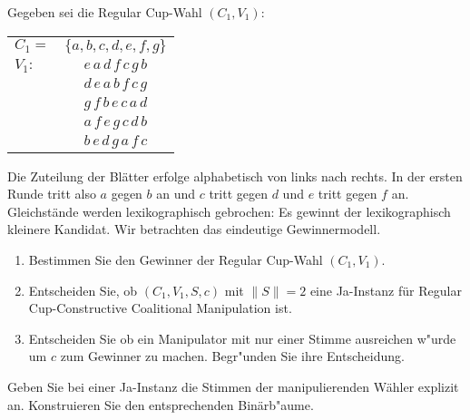 \documentclass[a4paper,12pt,titlepage,oneside]{article}
\newcommand\bc{\begin{center}}
\newcommand\ec{\end{center}}
\newcommand{\wahlind}[1]{(C_{#1},V_{#1})}
\newcommand{\ccmani}[1]{{\sc #1-Constructive Coalitional Manipulation}}
\begin{document}
\newline
Gegeben sei die Regular Cup-Wahl 
$\wahlind{1}$: 
\bc
\begin{tabular}{|lc|}
\hline
$C_1 =$&$ \{a,b,c,d,e,f,g\}$ 	\\
 $V_1:$ 	& $e\,a\,d\,f\,c\,g\,b$		\\
		& $d\,e\,a\,b\,f\,c\,g$		\\
		& $g\,f\,b\,e\,c\,a\,d$		\\
 		& $a\,f\,e\,g\,c\,d\,b$		\\
 		& $b\,e\,d\,g\,a\,f\,c$		\\
\hline
\end{tabular}
\ec
Die Zuteilung der Bl\"atter erfolge alphabetisch von links nach rechts. In der ersten Runde tritt also $a$ gegen $b$ an und $c$ tritt gegen $d$ und $e$ tritt gegen $f$ an. Gleichst\"ande werden lexikographisch gebrochen: Es gewinnt der
lexikographisch kleinere Kandidat. Wir betrachten das eindeutige Gewinnermodell.\\
\begin{enumerate}
\item Bestimmen Sie den Gewinner der  Regular Cup-Wahl 
$\wahlind{1}$.
\item Entscheiden Sie, ob $(C_1,V_1,S,c)$ mit $\|S\|=2$ eine Ja-Instanz f\"ur \ccmani{Regular Cup} ist.
\item Entscheiden Sie ob ein Manipulator mit nur einer Stimme ausreichen w"urde um $c$ zum Gewinner zu machen. Begr"unden Sie ihre Entscheidung.
\end{enumerate}
Geben Sie bei einer Ja-Instanz die Stimmen der manipulierenden W\"ahler explizit an. Konstruieren Sie den entsprechenden Bin\"arb"aume.

\vspace{0.5cm}
\end{document}
